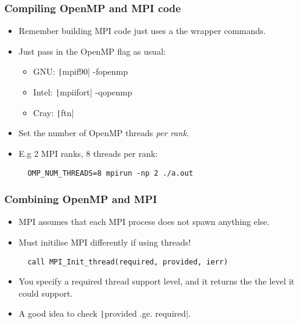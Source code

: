 \documentclass{beamer}
\begin{document}
\begin{frame}[fragile]
\frametitle{Compiling OpenMP and MPI code}
\begin{itemize}
  \item Remember building MPI code just uses a the wrapper commands.
  \item Just pass in the OpenMP flag as usual:
    \begin{itemize}
      \item GNU: \texttt|mpif90| -fopenmp
      \item Intel: \texttt|mpiifort| -qopenmp
      \item Cray: \texttt|ftn|
    \end{itemize}
  \item Set the number of OpenMP threads \emph{per rank}.
  \item E.g 2 MPI ranks, 8 threads per rank:
  \begin{verbatim}
  OMP_NUM_THREADS=8 mpirun -np 2 ./a.out
  \end{verbatim}
\end{itemize}
\end{frame}

\begin{frame}[fragile]
\frametitle{Combining OpenMP and MPI}
\begin{itemize}
  \item MPI assumes that each MPI process does not spawn anything else.
  \item Must initilise MPI differently if using threads!
  \begin{verbatim}
  call MPI_Init_thread(required, provided, ierr)
  \end{verbatim}

  \item You specify a required thread support level, and it returns the the level it could support.
  \item A good idea to check \texttt|provided .ge. required|.
\end{itemize}
\end{frame}
\end{document}
